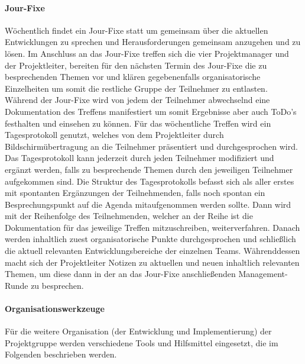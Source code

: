 \paragraph{Jour-Fixe}
Wöchentlich findet ein Jour-Fixe statt um gemeinsam über die aktuellen Entwicklungen zu sprechen und Herausforderungen gemeinsam anzugehen und zu lösen. Im Anschluss an das Jour-Fixe treffen sich die vier Projektmanager und der Projektleiter, bereiten für den nächsten Termin des Jour-Fixe die zu besprechenden Themen vor und klären gegebenenfalls organisatorische Einzelheiten um somit die restliche Gruppe der Teilnehmer zu entlasten. Während der Jour-Fixe wird von jedem der Teilnehmer abwechselnd eine Dokumentation des Treffens manifestiert um somit Ergebnisse aber auch ToDo's festhalten und einsehen zu können. Für das wöchentliche Treffen wird ein Tagesprotokoll genutzt, welches von dem Projektleiter durch Bildschirmübertragung an die Teilnehmer präsentiert und durchgesprochen wird. Das Tagesprotokoll kann jederzeit durch jeden Teilnehmer modifiziert und ergänzt werden, falls zu besprechende Themen durch den jeweiligen Teilnehmer aufgekommen sind. Die Struktur des Tagesprotokolls befasst sich als aller erstes mit spontanten Ergänzungen der Teilnehmenden, falls noch spontan ein Besprechungspunkt auf die Agenda mitaufgenommen werden sollte. Dann wird mit der Reihenfolge des Teilnehmenden, welcher an der Reihe ist die Dokumentation für das jeweilige Treffen mitzuschreiben, weiterverfahren. Danach werden inhaltlich zuest organisatorische Punkte durchgesprochen und schließlich die aktuell relevanten Entwicklungsbereiche der einzelnen Teams. Währenddessen macht sich der Projektleiter Notizen zu aktuellen und neuen inhaltlich relevanten Themen, um diese dann in der an das Jour-Fixe anschließenden Management-Runde zu besprechen.

\paragraph{Organisationswerkzeuge}
Für die weitere Organisation (der Entwicklung und Implementierung) der Projektgruppe werden verschiedene Tools und Hilfsmittel eingesetzt, die im Folgenden beschrieben werden.

